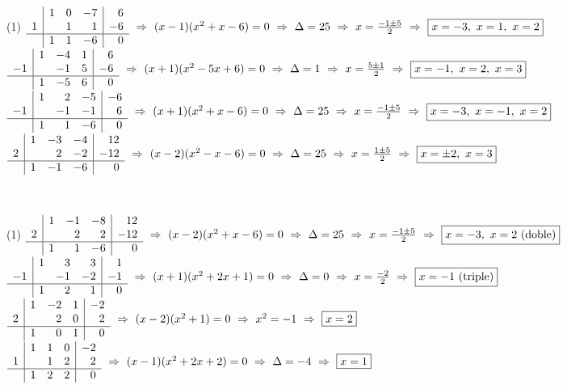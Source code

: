 \documentclass[11pt,a4paper]{article}
\newcommand{\estrelles}[1]{{\color{accent}\ifcase#1\or\faStar\faStar[regular]\faStar[regular]\or\faStar\faStar\faStar[regular]\or\faStar\faStar\faStar\fi}}
\newcounter{exer}
\newcommand{\ex}[1]{\par\needspace{4\baselineskip}\medskip\stepcounter{exer}\noindent{\color{navy}\bfseries\theexer.}\ \ {\small\estrelles{#1}}\ \ }
\newcommand{\res}[1]{\boxed{#1}}
\begin{document}
\ex{2} \begin{tasks}(1)
  \task $\begin{array}{r|rrr|r} & 1 & 0 & -7 & 6\\ 1 &  & 1 & 1 & -6\\ \hline & 1 & 1 & -6 & 0\end{array}\ \Rightarrow\ (x-1)(x^{2}+x-6)=0\ \Rightarrow\ \Delta=25\ \Rightarrow\ x=\tfrac{-1\pm5}{2}\ \Rightarrow\ \res{x=-3,\ x=1,\ x=2}$
  \task $\begin{array}{r|rrr|r} & 1 & -4 & 1 & 6\\ -1 &  & -1 & 5 & -6\\ \hline & 1 & -5 & 6 & 0\end{array}\ \Rightarrow\ (x+1)(x^{2}-5x+6)=0\ \Rightarrow\ \Delta=1\ \Rightarrow\ x=\tfrac{5\pm1}{2}\ \Rightarrow\ \res{x=-1,\ x=2,\ x=3}$
  \task $\begin{array}{r|rrr|r} & 1 & 2 & -5 & -6\\ -1 &  & -1 & -1 & 6\\ \hline & 1 & 1 & -6 & 0\end{array}\ \Rightarrow\ (x+1)(x^{2}+x-6)=0\ \Rightarrow\ \Delta=25\ \Rightarrow\ x=\tfrac{-1\pm5}{2}\ \Rightarrow\ \res{x=-3,\ x=-1,\ x=2}$
  \task $\begin{array}{r|rrr|r} & 1 & -3 & -4 & 12\\ 2 &  & 2 & -2 & -12\\ \hline & 1 & -1 & -6 & 0\end{array}\ \Rightarrow\ (x-2)(x^{2}-x-6)=0\ \Rightarrow\ \Delta=25\ \Rightarrow\ x=\tfrac{1\pm5}{2}\ \Rightarrow\ \res{x=\pm2,\ x=3}$
\end{tasks}

\ex{2} \begin{tasks}(1)
  \task $\begin{array}{r|rrr|r} & 1 & -1 & -8 & 12\\ 2 &  & 2 & 2 & -12\\ \hline & 1 & 1 & -6 & 0\end{array}\ \Rightarrow\ (x-2)(x^{2}+x-6)=0\ \Rightarrow\ \Delta=25\ \Rightarrow\ x=\tfrac{-1\pm5}{2}\ \Rightarrow\ \res{x=-3,\ x=2\ (\text{doble})}$
  \task $\begin{array}{r|rrr|r} & 1 & 3 & 3 & 1\\ -1 &  & -1 & -2 & -1\\ \hline & 1 & 2 & 1 & 0\end{array}\ \Rightarrow\ (x+1)(x^{2}+2x+1)=0\ \Rightarrow\ \Delta=0\ \Rightarrow\ x=\tfrac{-2}{2}\ \Rightarrow\ \res{x=-1\ (\text{triple})}$
  \task $\begin{array}{r|rrr|r} & 1 & -2 & 1 & -2\\ 2 &  & 2 & 0 & 2\\ \hline & 1 & 0 & 1 & 0\end{array}\ \Rightarrow\ (x-2)(x^{2}+1)=0\ \Rightarrow\ x^{2}=-1\ \Rightarrow\ \res{x=2}$
  \task $\begin{array}{r|rrr|r} & 1 & 1 & 0 & -2\\ 1 &  & 1 & 2 & 2\\ \hline & 1 & 2 & 2 & 0\end{array}\ \Rightarrow\ (x-1)(x^{2}+2x+2)=0\ \Rightarrow\ \Delta=-4\ \Rightarrow\ \res{x=1}$
\end{tasks}
\end{document}
